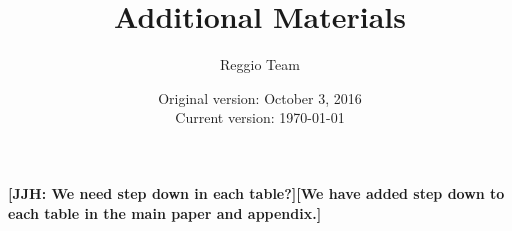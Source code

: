 

\setcounter{table}{0}
\renewcommand{\thetable}{A\arabic{table}}
\setcounter{figure}{0}
\renewcommand{\thefigure}{A\arabic{figure}}





\title{\Large \textbf{Additional Materials}}
\author{\normalsize Reggio Team}
\date{\normalsize Original version: October 3, 2016 \\ Current version: \today}
\maketitle

\textbf{[JJH: We need step down in each table?][We have added step down to each table in the main paper and appendix.]}

\tableofcontents

\doublespacing

